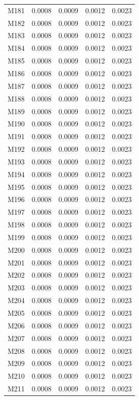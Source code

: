 \begin{longtable}{lrrrr}
M181 & 0.0008 & 0.0009 & 0.0012 & 0.0023 \\
M182 & 0.0008 & 0.0009 & 0.0012 & 0.0023 \\
M183 & 0.0008 & 0.0009 & 0.0012 & 0.0023 \\
M184 & 0.0008 & 0.0009 & 0.0012 & 0.0023 \\
M185 & 0.0008 & 0.0009 & 0.0012 & 0.0023 \\
M186 & 0.0008 & 0.0009 & 0.0012 & 0.0023 \\
M187 & 0.0008 & 0.0009 & 0.0012 & 0.0023 \\
M188 & 0.0008 & 0.0009 & 0.0012 & 0.0023 \\
M189 & 0.0008 & 0.0009 & 0.0012 & 0.0023 \\
M190 & 0.0008 & 0.0009 & 0.0012 & 0.0023 \\
M191 & 0.0008 & 0.0009 & 0.0012 & 0.0023 \\
M192 & 0.0008 & 0.0009 & 0.0012 & 0.0023 \\
M193 & 0.0008 & 0.0009 & 0.0012 & 0.0023 \\
M194 & 0.0008 & 0.0009 & 0.0012 & 0.0023 \\
M195 & 0.0008 & 0.0009 & 0.0012 & 0.0023 \\
M196 & 0.0008 & 0.0009 & 0.0012 & 0.0023 \\
M197 & 0.0008 & 0.0009 & 0.0012 & 0.0023 \\
M198 & 0.0008 & 0.0009 & 0.0012 & 0.0023 \\
M199 & 0.0008 & 0.0009 & 0.0012 & 0.0023 \\
M200 & 0.0008 & 0.0009 & 0.0012 & 0.0023 \\
M201 & 0.0008 & 0.0009 & 0.0012 & 0.0023 \\
M202 & 0.0008 & 0.0009 & 0.0012 & 0.0023 \\
M203 & 0.0008 & 0.0009 & 0.0012 & 0.0023 \\
M204 & 0.0008 & 0.0009 & 0.0012 & 0.0023 \\
M205 & 0.0008 & 0.0009 & 0.0012 & 0.0023 \\
M206 & 0.0008 & 0.0009 & 0.0012 & 0.0023 \\
M207 & 0.0008 & 0.0009 & 0.0012 & 0.0023 \\
M208 & 0.0008 & 0.0009 & 0.0012 & 0.0023 \\
M209 & 0.0008 & 0.0009 & 0.0012 & 0.0023 \\
M210 & 0.0008 & 0.0009 & 0.0012 & 0.0023 \\
M211 & 0.0008 & 0.0009 & 0.0012 & 0.0023 \\

\end{longtable}
